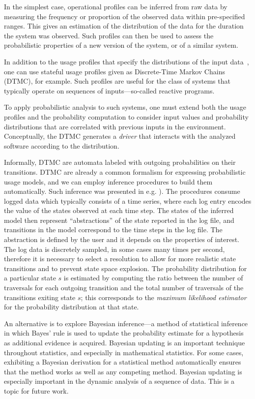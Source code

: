 In the simplest case, operational profiles can be inferred from raw
data by measuring the frequency or proportion of the observed data
within pre-specified ranges.  This gives an estimation of the
distribution of the data for the duration the system was observed.
Such profiles can then be used to assess the probabilistic properties
of a new version of the system, or of a similar system.


In addition to the usage profiles that specify the distributions of
the input data~\cite{filieri2013reliability}, one can use stateful usage profiles
given as Discrete-Time Markov Chains (DTMC), for example.  Such
profiles are useful for the class of systems that typically operate on
sequences of inputs---so-called reactive programs.

To apply probabilistic analysis to such systems, one must extend both
the usage profiles and the probability computation to consider input
values and probability distributions that are correlated with previous
inputs in the environment.  Conceptually, the DTMC generates a
\textit{driver} that interacts with the analyzed software according to
the distribution.

Informally, DTMC are automata labeled with outgoing probabilities on
their transitions.  DTMC are already a common formalism for expressing
probabilistic usage models, and we can employ inference procedures to
build them automatically.  Such inference was presented in
e.g. \cite{ghezzi2014mining,beschastnikh2011leveraging}). The procedures consume logged data
which typically consists of a time series, where each log entry encodes the value
of the states observed at each time step. The states of the inferred
model then represent ``abstractions'' of the state reported in the log
file, and transitions in the model correspond to the time steps in the
log file. The abstraction is defined by the user and it depends on the
properties of interest. The log data is discretely sampled, in some
cases many times per second, therefore it is necessary to select a
resolution to allow for more realistic state transitions and to
prevent state space explosion. The probability distribution for a
particular state $s$ is estimated by computing the ratio between the
number of traversals for each outgoing transition and the total number
of traversals of the transitions exiting state $s$; this corresponds
to the {\em maximum likelihood estimator} for the probability
distribution at that state.

An alternative is to explore Bayesian inference---a method of
statistical inference in which Bayes' rule is used to update the
probability estimate for a hypothesis as additional evidence is
acquired. Bayesian updating is an important technique throughout
statistics, and especially in mathematical statistics. For some cases,
exhibiting a Bayesian derivation for a statistical method
automatically ensures that the method works as well as any competing
method. Bayesian updating is especially important in the dynamic
analysis of a sequence of data. This is a topic for future work.


